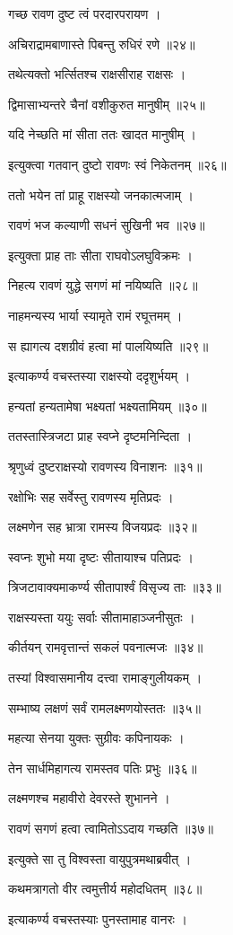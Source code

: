 गच्छ रावण दुष्ट त्वं परदारपरायण ।

अचिराद्रामबाणास्ते पिबन्तु रुधिरं रणे ॥२४॥

तथेत्यक्तो भर्त्सितश्च राक्षसीराह राक्षसः ।

द्विमासाभ्यन्तरे चैनां वशीकुरुत मानुषीम् ॥२५॥

यदि नेच्छति मां सीता ततः खादत मानुषीम् ।

इत्युक्त्वा गतवान् दुष्टो रावणः स्वं निकेतनम् ॥२६॥

ततो भयेन तां प्राहू राक्षस्यो जनकात्मजाम् ।

रावणं भज कल्याणी सधनं सुखिनी भव ॥२७॥

इत्युक्ता प्राह ताः सीता राघवोऽलघुविक्रमः ।

निहत्य रावणं युद्धे सगणं मां नयिष्यति ॥२८॥

नाहमन्यस्य भार्या स्यामृते रामं रघूत्तमम् ।

स ह्यागत्य दशग्रीवं हत्वा मां पालयिष्यति ॥२९॥

इत्याकर्ण्य वचस्तस्या राक्षस्यो ददृशुर्भयम् ।

हन्यतां हन्यतामेषा भक्ष्यतां भक्ष्यतामियम् ॥३०॥

ततस्तास्त्रिजटा प्राह स्वप्ने दृष्टमनिन्दिता ।

श्रृणुध्वं दुष्टराक्षस्यो रावणस्य विनाशनः ॥३१॥

रक्षोभिः सह सर्वेस्तु रावणस्य मृतिप्रदः ।

लक्ष्मणेन सह भ्रात्रा रामस्य विजयप्रदः ॥३२॥

स्वप्नः शुभो मया दृष्टः सीतायाश्च पतिप्रदः ।

त्रिजटावाक्यमाकर्ण्य सीतापार्श्वं विसृज्य ताः ॥३३॥

राक्षस्यस्ता ययुः सर्वाः सीतामाहाञ्जनीसुतः ।

कीर्तयन् रामवृत्तान्तं सकलं पवनात्मजः ॥३४॥

तस्यां विश्वासमानीय दत्त्वा रामाङ्गुलीयकम् ।

सम्भाष्य लक्षणं सर्वं रामलक्ष्मणयोस्ततः ॥३५॥

महत्या सेनया युक्तः सुग्रीवः कपिनायकः ।

तेन सार्धमिहागत्य रामस्तव पतिः प्रभुः ॥३६॥

लक्ष्मणश्च महावीरो देवरस्ते शुभानने ।

रावणं सगणं हत्वा त्वामितोऽऽदाय गच्छति ॥३७॥

इत्युक्ते सा तु विश्वस्ता वायुपुत्रमथाब्रवीत् ।

कथमत्रागतो वीर त्वमुत्तीर्य महोदधितम् ॥३८॥

इत्याकर्ण्य वचस्तस्याः पुनस्तामाह वानरः ।

